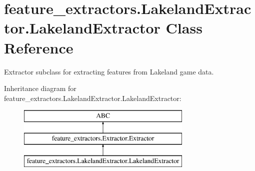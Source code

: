 \hypertarget{classfeature__extractors_1_1_lakeland_extractor_1_1_lakeland_extractor}{}\section{feature\+\_\+extractors.\+Lakeland\+Extractor.\+Lakeland\+Extractor Class Reference}
\label{classfeature__extractors_1_1_lakeland_extractor_1_1_lakeland_extractor}


Extractor subclass for extracting features from Lakeland game data.  


Inheritance diagram for feature\+\_\+extractors.\+Lakeland\+Extractor.\+Lakeland\+Extractor\+:\begin{figure}[H]
\begin{center}
\leavevmode
\includegraphics[height=3.000000cm]{classfeature__extractors_1_1_lakeland_extractor_1_1_lakeland_extractor}
\end{center}
\end{figure}

